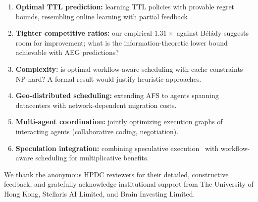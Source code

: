 \documentclass[sigconf]{acmart}
\begin{document}
\begin{enumerate}[leftmargin=*,noitemsep,topsep=0pt]
    \item \textbf{Optimal TTL prediction:} learning TTL policies with provable regret bounds, resembling online learning with partial feedback~\cite{lattimore2020bandit}.
    \item \textbf{Tighter competitive ratios:} our empirical $1.31\times$ against B\'el\'ady suggests room for improvement; what is the information-theoretic lower bound achievable with AEG predictions?
    \item \textbf{Complexity:} is optimal workflow-aware scheduling with cache constraints NP-hard? A formal result would justify heuristic approaches.
    \item \textbf{Geo-distributed scheduling:} extending AFS to agents spanning datacenters with network-dependent migration costs.
    \item \textbf{Multi-agent coordination:} jointly optimizing execution graphs of interacting agents (collaborative coding, negotiation).
    \item \textbf{Speculation integration:} combining speculative execution~\cite{specactions2026,sherlock2024} with workflow-aware scheduling for multiplicative benefits.
\end{enumerate}

\begin{acks}
We thank the anonymous HPDC reviewers for their detailed, constructive feedback, and gratefully acknowledge institutional support from The University of Hong Kong, Stellaris AI Limited, and Brain Investing Limited.
\end{acks}



\end{document}
